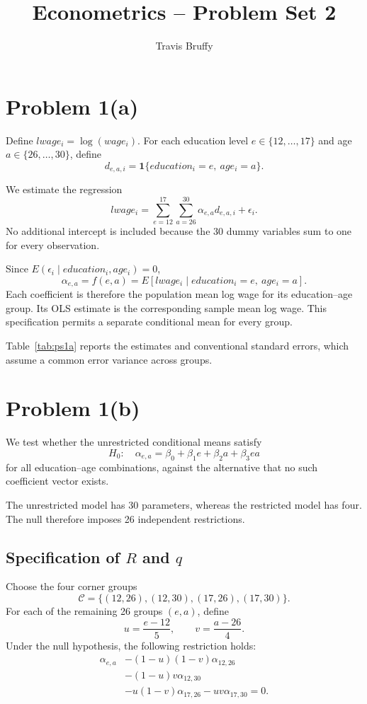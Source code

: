 \documentclass[11pt]{article}
\title{Econometrics -- Problem Set 2}
\author{Travis Bruffy}
\date{}
\begin{document}
\maketitle

\section*{Problem 1(a)}

Define $lwage_i=\log(wage_i)$. For each education level
$e\in\{12,\ldots,17\}$ and age $a\in\{26,\ldots,30\}$,
define
\[
d_{e,a,i}
=\mathbf{1}\{education_i=e,\ age_i=a\}.
\]

We estimate the regression
\[
lwage_i
=\sum_{e=12}^{17}\sum_{a=26}^{30}
\alpha_{e,a}d_{e,a,i}+\epsilon_i.
\]
No additional intercept is included because the
30 dummy variables sum to one for every observation.

Since $E(\epsilon_i\mid education_i,age_i)=0$,
\[
\alpha_{e,a}
=f(e,a)
=E[lwage_i\mid education_i=e,\ age_i=a].
\]
Each coefficient is therefore the population mean
log wage for its education--age group. Its OLS
estimate is the corresponding sample mean log wage.
This specification permits a separate conditional
mean for every group.

Table~\ref{tab:ps1a} reports the estimates and
conventional standard errors, which assume a
common error variance across groups.

\begin{table}[htbp]
\centering
\small
\caption{Education--age group estimates}
\label{tab:ps1a}

\end{table}
\clearpage
\section*{Problem 1(b)}

We test whether the unrestricted conditional means satisfy
\[
H_0:\quad
\alpha_{e,a}
=\beta_0+\beta_1 e+\beta_2 a+\beta_3 ea
\]
for all education--age combinations, against the
alternative that no such coefficient vector exists.

The unrestricted model has 30 parameters, whereas
the restricted model has four. The null therefore
imposes 26 independent restrictions.

\subsection*{Specification of $R$ and $q$}

Choose the four corner groups
\[
\mathcal{C}
=\{(12,26),(12,30),(17,26),(17,30)\}.
\]
For each of the remaining 26 groups $(e,a)$, define
\[
u=\frac{e-12}{5},
\qquad
v=\frac{a-26}{4}.
\]
Under the null hypothesis, the following restriction holds:
\[
\begin{aligned}
\alpha_{e,a}
&-(1-u)(1-v)\alpha_{12,26}\\
&-(1-u)v\alpha_{12,30}\\
&-u(1-v)\alpha_{17,26}
-uv\alpha_{17,30}=0.
\end{aligned}
\]
\end{document}
